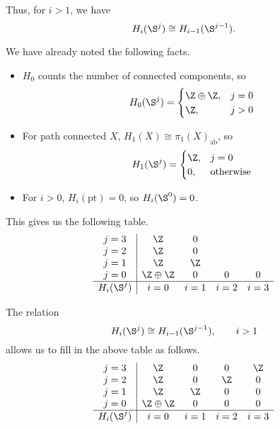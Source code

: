 \documentclass[main.tex]{subfiles}
\begin{document}
\begin{example}
  Thus, for $i > 1$, we have
  \begin{equation*}
    H_{i}(\S^{j}) \cong H_{i-1}(\S^{j-1}).
  \end{equation*}

  We have already noted the following facts.
  \begin{itemize}
    \item $H_{0}$ counts the number of connected components, so
      \begin{equation*}
        H_{0}(\S^{j}) =
        \begin{cases}
          \Z \oplus \Z, & j = 0 \\
          \Z, & j > 0
        \end{cases}
      \end{equation*}
    \item For path connected $X$, $H_{1}(X) \cong \pi_{1}(X)_{\mathrm{ab}}$, so
      \begin{equation*}
        H_{1}(\S^{j}) =
        \begin{cases}
          \Z, & j = 0 \\
          0, &\text{otherwise}
        \end{cases}
      \end{equation*}
    \item For $i > 0$, $H_{i}(\mathrm{pt}) = 0$, so $H_{i}(\S^{0}) = 0$.
  \end{itemize}
  This gives us the following table.
  \begin{equation*}
    \begin{array}{c|cccc}
      j = 3
      & \Z
      & 0
      \\
      j = 2
      & \Z
      & 0
      \\
      j = 1
      & \Z
      & \Z
      \\
      j = 0
      & \Z \oplus \Z
      & 0
      & 0
      & 0
      \\
      \hline
      H_{i}(\S^{j})
      & i = 0
      & i = 1
      & i = 2
      & i = 3
    \end{array}
  \end{equation*}

  The relation
  \begin{equation*}
    H_{i}(\S^{j}) \cong H_{i-1}(\S^{j-1}),\qquad i > 1
  \end{equation*}
  allows us to fill in the above table as follows.
  \begin{equation}
    \label{eq:homology_groups_of_spheres}
    \begin{array}{c|cccc}
      j = 3
      & \Z
      & 0
      & 0
      & \Z
      \\
      j = 2
      & \Z
      & 0
      & \Z
      & 0
      \\
      j = 1
      & \Z
      & \Z
      & 0
      & 0
      \\
      j = 0
      & \Z \oplus \Z
      & 0
      & 0
      & 0
      \\
      \hline
      H_{i}(\S^{j})
      & i = 0
      & i = 1
      & i = 2
      & i = 3
    \end{array}
  \end{equation}
\end{example}
\end{document}
